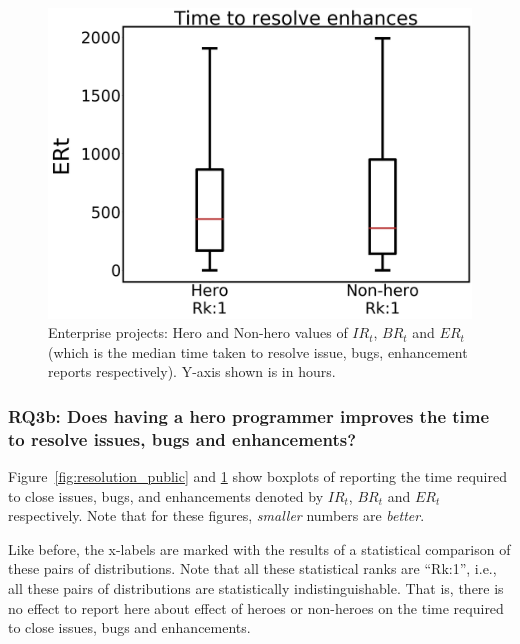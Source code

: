 \documentclass[sigconf]{acmart}
\theoremstyle{break}
\begin{document}
\begin{figure}[!t]
\begin{minipage}{.33\linewidth}
        \includegraphics[width=\linewidth]{./fig/ERt_w.png}
    \end{minipage}%
    \caption{Enterprise projects:   Hero and Non-hero values of  $IR_t$, $BR_t$ and $ER_t$ (which is the median time taken to resolve issue, bugs, enhancement reports respectively). Y-axis shown is in hours.}
    \label{fig:resolution_enterprise}
\end{figure}



\subsubsection{RQ3b: Does having a hero programmer improves the time to resolve issues, bugs and enhancements?}

Figure~\ref{fig:resolution_public} and \ref{fig:resolution_enterprise} show   boxplots of   reporting
the time required to close issues, bugs, and enhancements denoted  by $IR_t$, $BR_t$ and $ER_t$ respectively.   Note that for these figures, {\em smaller} numbers are {\em better}.

Like before, the x-labels are marked with the results of a statistical comparison of
these pairs of distributions. Note that all these statistical ranks are  ``Rk:1'', i.e., 
all these pairs of distributions are statistically indistinguishable.
That is, there is no effect to report here about effect of heroes or non-heroes on
the time required to close issues, bugs and enhancements.
\end{document}
